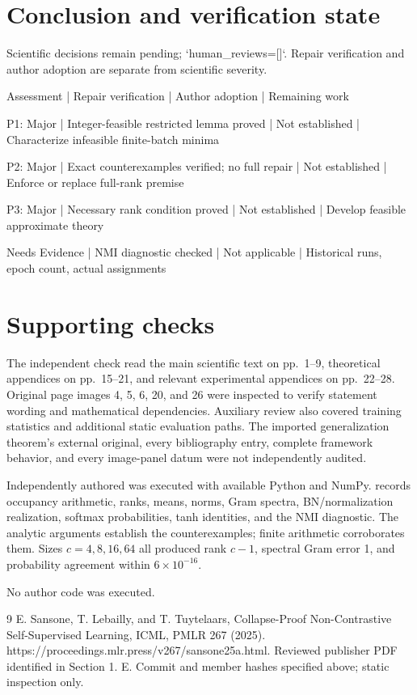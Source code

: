 \documentclass[10pt]{article}
\begin{document}
\section*{Conclusion and verification state}
Scientific decisions remain pending; `human\_reviews=[]`. Repair verification and author adoption are separate from scientific severity.\par
Assessment | Repair verification | Author adoption | Remaining work\par
P1: Major | Integer-feasible restricted lemma proved | Not established | Characterize infeasible finite-batch minima\par
P2: Major | Exact counterexamples verified; no full repair | Not established | Enforce or replace full-rank premise\par
P3: Major | Necessary rank condition proved | Not established | Develop feasible approximate theory\par
Needs Evidence | NMI diagnostic checked | Not applicable | Historical runs, epoch count, actual assignments\par
\section*{Supporting checks}
The independent check read the main scientific text on pp. 1–9, theoretical appendices on pp. 15–21, and relevant experimental appendices on pp. 22–28. Original page images 4, 5, 6, 20, and 26 were inspected to verify statement wording and mathematical dependencies. Auxiliary review also covered training statistics and additional static evaluation paths. The imported generalization theorem’s external original, every bibliography entry, complete framework behavior, and every image-panel datum were not independently audited.\par
Independently authored was executed with available Python and NumPy. records occupancy arithmetic, ranks, means, norms, Gram spectra, BN/normalization realization, softmax probabilities, tanh identities, and the NMI diagnostic. The analytic arguments establish the counterexamples; finite arithmetic corroborates them. Sizes \(c=4,8,16,64\) all produced rank \(c-1\), spectral Gram error 1, and probability agreement within \(6\times10^{-16}\).\par
No author code was executed.\par
9 E. Sansone, T. Lebailly, and T. Tuytelaars, Collapse-Proof Non-Contrastive Self-Supervised Learning, ICML, PMLR 267 (2025). https://proceedings.mlr.press/v267/sansone25a.html. Reviewed publisher PDF identified in Section 1. E. Commit and member hashes specified above; static inspection only.\par
\end{document}
